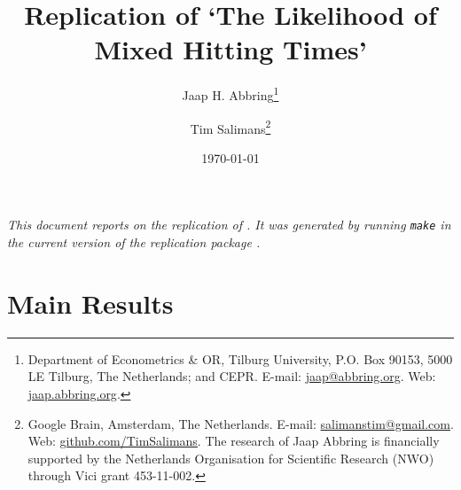 \documentclass[fleqn,12pt]{article}
\begin{document}
\title{Replication of `The Likelihood of Mixed Hitting Times'}

\author{Jaap H. Abbring\thanks{%
Department of Econometrics \& OR, Tilburg University, P.O. Box 90153, 5000 LE Tilburg, The Netherlands; and CEPR. E-mail:
\href{mailto:jaap@abbring.org}{jaap@abbring.org}. Web: \href{http://jaap.abbring.org}{jaap.abbring.org}.}\and Tim Salimans\thanks{Google Brain, Amsterdam, The Netherlands. E-mail:
\href{mailto:salimanstim@gmail.com}{salimanstim@gmail.com}. Web: \href{http://github.com/TimSalimans}{github.com/TimSalimans}.
\newline The research of Jaap Abbring is financially supported by the Netherlands Organisation for Scientific Research (NWO) through Vici grant 453-11-002. 
}}

\date{\today}

\maketitle

{\em This document reports on the replication of \citet{jem21:abbringsalimans}. It was generated by running {\tt make} in the current version of the replication package \citep{zenodo21:abbringsalimans}.}

\section{Main Results}
\end{document}
